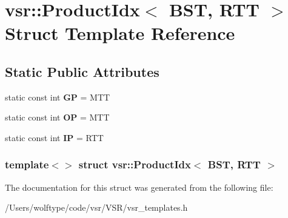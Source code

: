 \hypertarget{structvsr_1_1_product_idx_3_01_b_s_t_00_01_r_t_t_01_4}{\section{vsr\-:\-:Product\-Idx$<$ B\-S\-T, R\-T\-T $>$ Struct Template Reference}
\label{structvsr_1_1_product_idx_3_01_b_s_t_00_01_r_t_t_01_4}
}
\subsection*{Static Public Attributes}
\begin{DoxyCompactItemize}
\item 
\hypertarget{structvsr_1_1_product_idx_3_01_b_s_t_00_01_r_t_t_01_4_a5fa7710981b6cc9f38b71e5e7e6870be}{static const int {\bfseries G\-P} = M\-T\-T}\label{structvsr_1_1_product_idx_3_01_b_s_t_00_01_r_t_t_01_4_a5fa7710981b6cc9f38b71e5e7e6870be}

\item 
\hypertarget{structvsr_1_1_product_idx_3_01_b_s_t_00_01_r_t_t_01_4_a0ece4ce9109b4cc7e9ee093b569b8e97}{static const int {\bfseries O\-P} = M\-T\-T}\label{structvsr_1_1_product_idx_3_01_b_s_t_00_01_r_t_t_01_4_a0ece4ce9109b4cc7e9ee093b569b8e97}

\item 
\hypertarget{structvsr_1_1_product_idx_3_01_b_s_t_00_01_r_t_t_01_4_a16825a8d9e314af98abda0b6dd5fbc9a}{static const int {\bfseries I\-P} = R\-T\-T}\label{structvsr_1_1_product_idx_3_01_b_s_t_00_01_r_t_t_01_4_a16825a8d9e314af98abda0b6dd5fbc9a}

\end{DoxyCompactItemize}
\subsubsection*{template$<$$>$ struct vsr\-::\-Product\-Idx$<$ B\-S\-T, R\-T\-T $>$}



The documentation for this struct was generated from the following file\-:\begin{DoxyCompactItemize}
\item 
/\-Users/wolftype/code/vsr/\-V\-S\-R/vsr\-\_\-templates.\-h\end{DoxyCompactItemize}
